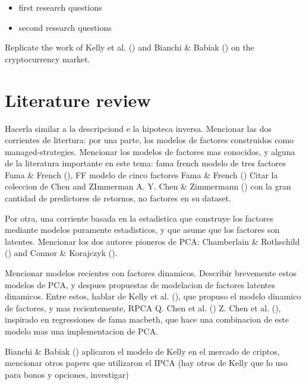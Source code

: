 \documentclass[
  12pt,
  a4paper,
  openany]{scrbook}
\providecommand{\tightlist}{%
  \setlength{\itemsep}{0pt}\setlength{\parskip}{0pt}}
\begin{document}
\begin{itemize}
\tightlist
\item
  first research questions
\item
  second research questions
\end{itemize}

Replicate the work of Kelly et al.
() and Bianchi \& Babiak
() on the
cryptocurrency market.

\section{Literature review}\label{literature-review}

Hacerla similar a la descripciond e la hipoteca inversa. Mencionar las
dos corrientes de litertura: por una parte, los modelos de factores
construidos como managed-strategies. Mencionar los modelos de factores
mas conocidos, y alguna de la literatura importante en este tema: fama
french modelo de tres factores Fama \& French
(), FF modelo de cinco factores
Fama \& French () Citar la
coleccion de Chen and ZImmerman A. Y. Chen \& Zimmermann
() con la gran cantidad de
predictores de retornos, no factores en su dataset.

Por otra, una corriente basada en la estadistica que construye los
factores mediante modelos puramente estadisticos, y que asume que los
factores son latentes. Mencionar los dos autores pioneros de PCA:
Chamberlain \& Rothschild
() and Connor \&
Korajczyk ().

Mencionar modelos recientes con factores dinamicos. Describir brevemente
estos modelos de PCA, y despues propuestas de modelacion de factores
latentes dinamicos. Entre estos, hablar de Kelly et al.
(), que propuso el
modelo dinamico de factores, y mas recientemente, RPCA Q. Chen et al.
() Z. Chen et al.
(), inspirado en regressiones de
fama macbeth, que hace una combinacion de este modelo mas una
implementacion de PCA.

Bianchi \& Babiak
() aplicaron
el modelo de Kelly en el mercado de criptos, mencionar otros papers que
utilizaron el IPCA (hay otros de Kelly que lo uso para bonos y opciones,
investigar)
\end{document}
